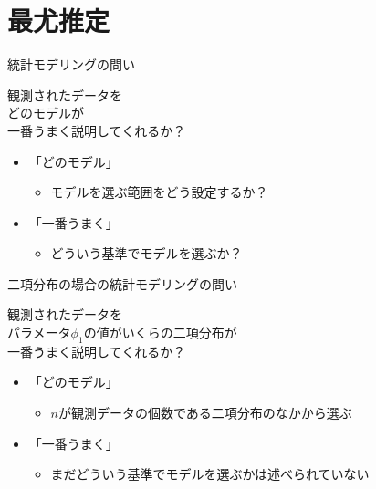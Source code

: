 \documentclass[aspectratio=169,unicode,dvipdfmx,14pt]{beamer}
\begin{document}
\section{最尤推定}

\begin{frame}{統計モデリングの問い}
\vspace{-.5in}
\begin{block}{}
\large \center 観測されたデータを\\どのモデルが\\一番うまく説明してくれるか？
\end{block}
\vspace{.3in}
\begin{itemize}
\item 「どのモデル」
\begin{itemize}
\item モデルを選ぶ範囲をどう設定するか？
\end{itemize}
\item 「一番うまく」
\begin{itemize}
\item どういう基準でモデルを選ぶか？
\end{itemize}
\end{itemize}
\end{frame}

\begin{frame}{二項分布の場合の統計モデリングの問い}
\vspace{-.5in}
\begin{block}{}
\large \center 観測されたデータを\\
パラメータ$\phi_1$の値がいくらの二項分布が\\
一番うまく説明してくれるか？
\end{block}
\vspace{.3in}
\begin{itemize}
\item 「どのモデル」
\begin{itemize}
\item $n$が観測データの個数である二項分布のなかから選ぶ
\end{itemize}
\item 「一番うまく」
\begin{itemize}
\item まだどういう基準でモデルを選ぶかは述べられていない
\end{itemize}
\end{itemize}
\end{frame}
\end{document}
